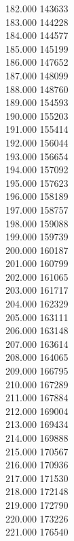 { 182.000	143633 \\
 183.000	144228 \\
 184.000	144577 \\
 185.000	145199 \\
 186.000	147652 \\
 187.000	148099 \\
 188.000	148760 \\
 189.000	154593 \\
 190.000	155203 \\
 191.000	155414 \\
 192.000	156044 \\
 193.000	156654 \\
 194.000	157092 \\
 195.000	157623 \\
 196.000	158189 \\
 197.000	158757 \\
 198.000	159088 \\
 199.000	159739 \\
 200.000	160187 \\
 201.000	160799 \\
 202.000	161065 \\
 203.000	161717 \\
 204.000	162329 \\
 205.000	163111 \\
 206.000	163148 \\
 207.000	163614 \\
 208.000	164065 \\
 209.000	166795 \\
 210.000	167289 \\
 211.000	167884 \\
 212.000	169004 \\
 213.000	169434 \\
 214.000	169888 \\
 215.000	170567 \\
 216.000	170936 \\
 217.000	171530 \\
 218.000	172148 \\
 219.000	172790 \\
 220.000	173226 \\
 221.000	176540 \\
}
